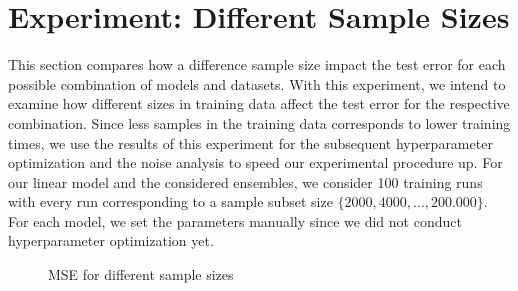 \section{Experiment: Different Sample Sizes}\label{sec:samplesize}

This section compares how a difference sample size impact the test error for each possible combination of models and datasets. With this experiment, we intend to examine how different sizes in training data affect the test error for the respective combination. Since less samples in the training data corresponds to lower training times, we use the results of this experiment for the subsequent hyperparameter optimization and the noise analysis to speed our experimental procedure up. For our linear model and the considered ensembles, we consider 100 training runs with every run corresponding to a sample subset size $ \{2000, 4000, \dots, 200.000\} $. For each model, we set the parameters manually since we did not conduct hyperparameter optimization yet. 

\begin{figure}[h]
	\centering
	\caption{MSE for different sample sizes}
	\label{fig:convergences}
\end{figure}

